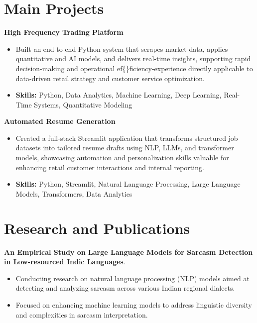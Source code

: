 \documentclass[a4paper,11pt]{article}
\begin{document}
\section{\textbf{Main Projects}}

\vspace{1mm}
  \textbf{High Frequency Trading Platform  }
\vspace{-1.5mm} %
\begin{itemize}
  \item Built an end-to-end Python system that scrapes market data, applies quantitative and AI models, and delivers real-time insights, supporting rapid decision-making and operational ef\{\}ficiency-experience directly applicable to data-driven retail strategy and customer service optimization.
\vspace{-3mm}
  \item \textbf{Skills:} Python, Data Analytics, Machine Learning, Deep Learning, Real-Time Systems, Quantitative Modeling
\end{itemize}


\vspace{1mm}
   \textbf{Automated Resume Generation }
\vspace{-1.5mm} %
\begin{itemize}
  \item Created a full-stack Streamlit application that transforms structured job datasets into tailored resume drafts using NLP, LLMs, and transformer models, showcasing automation and personalization skills valuable for enhancing retail customer interactions and internal reporting.
\vspace{-3mm}
  \item \textbf{Skills:} Python, Streamlit, Natural Language Processing, Large Language Models, Transformers, Data Analytics
\end{itemize}



\section{\textbf{Research and Publications} \hfill }
\vspace{1mm}
  \textbf{An Empirical Study on Large Language Models for Sarcasm Detection in Low-resourced Indic Languages}.
\vspace{-1mm} %
\begin{itemize}
  \item Conducting research on natural language processing (NLP) models aimed at detecting and analyzing sarcasm across various Indian regional dialects.
\vspace{-3mm}
  \item Focused on enhancing machine learning models to address linguistic diversity and complexities in sarcasm interpretation.
\end{itemize}
\end{document}
